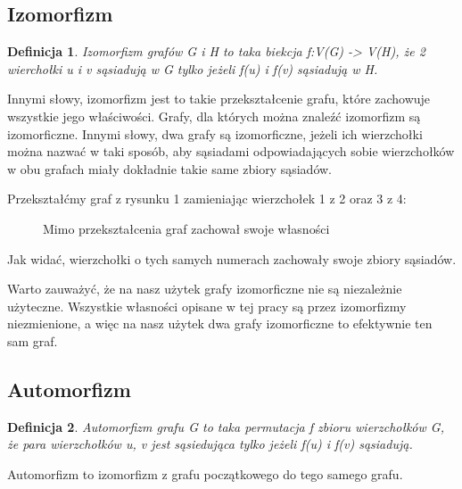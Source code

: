 \documentclass[11pt]{article}
\newtheorem{definition}{Definicja}[section]
\begin{document}
  \subsection{Izomorfizm}

  \begin{definition}
    Izomorfizm grafów G i H to taka biekcja f:V(G) -> V(H), że 2 wierchołki u i v sąsiadują w G tylko jeżeli f(u) i f(v) sąsiadują w H.
  \end{definition}

  Innymi słowy, izomorfizm jest to takie przekształcenie grafu, które zachowuje wszystkie jego właściwości. Grafy, dla których można znaleźć izomorfizm są izomorficzne. Innymi słowy, dwa grafy są izomorficzne, jeżeli ich wierzchołki można nazwać w taki sposób, 
  aby sąsiadami odpowiadających sobie wierzchołków w obu grafach miały dokładnie takie same zbiory sąsiadów.
  

  Przekształćmy graf z rysunku 1 zamieniając wierzchołek 1 z 2 oraz 3 z 4:
  \begin{figure}[h]
    \centering
    \caption{Mimo przekształcenia graf zachował swoje własności}
  \end{figure}

  Jak widać, wierzchołki o tych samych numerach zachowały swoje zbiory sąsiadów. 

  Warto zauważyć, że na nasz użytek grafy izomorficzne nie są niezależnie użyteczne. Wszystkie własności opisane w tej pracy są przez izomorfizmy niezmienione, a więc na nasz użytek dwa grafy izomorficzne to efektywnie ten sam graf.


  \subsection{Automorfizm}

  \begin{definition}
    Automorfizm grafu G to taka permutacja f zbioru wierzchołków G, że para wierzchołków u, v jest sąsiedująca tylko jeżeli f(u) i f(v) sąsiadują. 
  \end{definition}
  Automorfizm to izomorfizm z grafu początkowego do tego samego grafu. 
\end{document}
